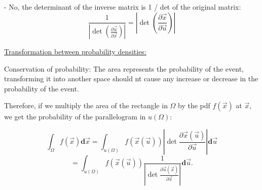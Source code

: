 


- No, the determinant of the inverse matrix is 1 / det of the original matrix:
$$
\frac{1}{\left| \det \left( \frac{\partial \vec u}{\partial \vec x} \right) \right|} =
{\left| \det \left( \frac{\partial \vec x}{\partial \vec u} \right) \right|}
$$

\underline{Transformation between probability densities:}

Conservation of probability: The area represents the probability of the event, 
transforming it into another space should nt cause any increase or decrease in the probability of the event.

Therefore, if we multiply the area of the rectangle in $\Omega$ by the pdf $f(\vec x)$ at $\vec x$, we get the probability of the parallelogram in $u(\Omega)$:

$$
\int_{\Omega} f(\vec{x}) \mathbf{d}\vec{x}
=\int_{u(\Omega)} f({\vec x(\vec u)}) \left|\det \frac{\partial \vec{x}(\vec{u})}{\partial \vec{u}} \right| \mathbf{d}\vec{u}
$$
$$
=\int_{u(\Omega)} f({\vec x(\vec u)}) \frac{1}{\left|\det \frac{\partial \vec{u}(\vec{x})}{\partial \vec{x}} \right|} \mathbf{d}\vec{u}.
$$

